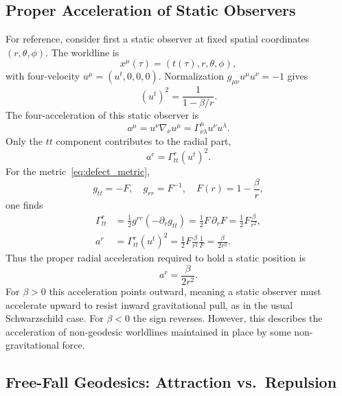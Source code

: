 \documentclass[%
  reprint,
  superscriptaddress,
  showpacs,
  showkeys,
  amsmath,amssymb,
  pra,
  longbibliography,
  floatfix,
  x11names
]{revtex4-2}
\begin{document}
\subsection{Proper Acceleration of Static Observers}

For reference, consider first a static observer at fixed spatial coordinates \((r,\theta,\phi)\). The worldline is
\[
x^\mu(\tau) = (t(\tau), r, \theta, \phi),
\]
with four-velocity \(u^\mu = (u^t,0,0,0)\). Normalization \(g_{\mu\nu}u^\mu u^\nu = -1\) gives
\begin{equation}
(u^t)^2 = \frac{1}{1-\beta/r}.
\end{equation}
The four-acceleration of this static observer is
\begin{equation}
a^\mu = u^\nu \nabla_\nu u^\mu = \Gamma^\mu_{\nu\lambda} u^\nu u^\lambda.
\end{equation}
Only the \(tt\) component contributes to the radial part,
\begin{equation}
a^r = \Gamma^r_{tt} (u^t)^2.
\end{equation}
For the metric~\eqref{eq:defect_metric},
\begin{equation}
g_{tt} = -F,\quad g_{rr} = F^{-1},\quad F(r) = 1 - \frac{\beta}{r},
\end{equation}
one finds
\begin{align}
\Gamma^r_{tt}
&= \frac{1}{2} g^{rr} \left(-\partial_r g_{tt}\right)
= \frac{1}{2} F \, \partial_r F
= \frac{1}{2} F \frac{\beta}{r^2},\\
a^r &= \Gamma^r_{tt}(u^t)^2
= \frac{1}{2} F \frac{\beta}{r^2} \frac{1}{F}
= \frac{\beta}{2r^2}.
\end{align}
Thus the proper radial acceleration required to hold a static position is
\begin{equation}
a^r = \frac{\beta}{2r^2}.
\end{equation}
For \(\beta>0\) this acceleration points outward, meaning a static observer must accelerate upward to resist inward gravitational pull, as in the usual Schwarzschild case. For \(\beta<0\) the sign reverses. However, this describes the acceleration of non-geodesic worldlines maintained in place by some non-gravitational force.

\subsection{Free-Fall Geodesics: Attraction vs.\ Repulsion}
\end{document}
